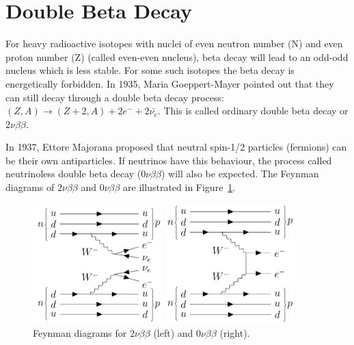 \documentclass[preprint,12pt]{elsarticle}
\numberwithin{equation}{section}
\begin{document}
\section{Double Beta Decay}

For heavy radioactive isotopes with nuclei of even neutron number (N) and even proton number (Z) (called even-even nucleus), beta decay will lead to an odd-odd nucleus which is less stable. For some such isotopes the beta decay is energetically forbidden. In 1935, Maria Goeppert-Mayer pointed out that they can still decay through a double beta decay process: $(Z,A) \to (Z+2,A)+2e^{-}+2\bar{\nu_e}$. This is called ordinary double beta decay or $2\nu\beta\beta$\cite{martin}.

In 1937, Ettore Majorana proposed that neutral spin-1/2 particles (fermions) can be their own antiparticles\cite{majorana}. If neutrinos have this behaviour, the process called neutrinoless double beta decay ($0\nu\beta\beta$) will also be expected. The Feynman diagrams of $2\nu\beta\beta$ and $0\nu\beta\beta$ are illustrated in Figure~\ref{feynman1}.

\begin{figure}[htbp]
	\centering	
	\begin{minipage}[t]{0.45\textwidth}
	\includegraphics[width=5cm]{doubleBeta2nu_feynman.png}
	\end{minipage}
	\begin{minipage}[t]{0.45\textwidth}
	\includegraphics[width=5cm]{doubleBeta_feynman.png}
	\end{minipage}
	\caption{ Feynman diagrams for $2\nu\beta\beta$ (left) and $0\nu\beta\beta$ (right).}
	\label{feynman1}
\end{figure}
\end{document}
